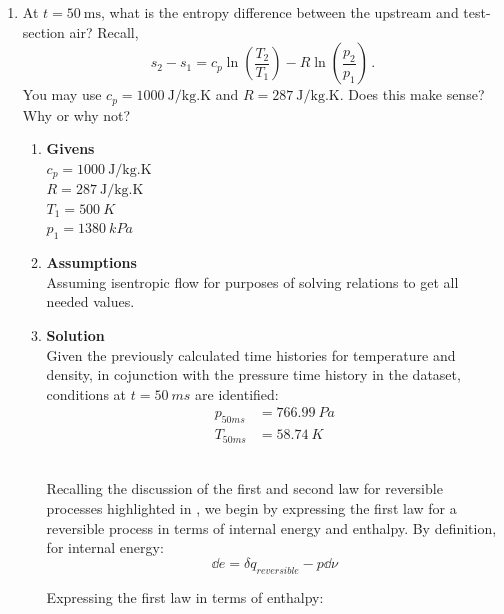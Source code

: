 \documentclass[12pt,letterpaper]{article}
\begin{document}
\begin{enumerate}[label=(\alph*)]
\begin{enumerate}[label=\arabic*.]
		\end{enumerate}
			\item At $t=50 \ \unit{\milli\second}$, what is the entropy difference between the upstream and test-section air? Recall,
			\begin{equation*}
				s_2 - s_1 = c_p \ln(\frac{T_2}{T_1}) - R \ln(\frac{p_2}{p_1}) \,.
			\end{equation*}
			You may use $c_p = 1000 \ \unit{\joule/\kilogram.\kelvin}$ and $R = 287 \ \unit{\joule/\kilogram.\kelvin}$. Does this make sense? Why or why not?
		\begin{enumerate}[label=\arabic*.]
			\item{\textbf{Givens}}\\
			$c_p = 1000 \ \unit{\joule/\kilogram.\kelvin}$\\
			$R = 287 \ \unit{\joule/\kilogram.\kelvin}$\\
			$T_1 = 500 \ K$\\
			$p_1 = 1380 \ \unit{kPa}$

			\item{\textbf{Assumptions}}\\
			Assuming isentropic flow for purposes of solving relations to get all needed values. 

			\item{\textbf{Solution}}\\
			Given the previously calculated time histories for temperature and density, in cojunction with the pressure time history in the dataset, conditions at $t = 50 \ \unit{ms}$ are identified:
			\begin{align*}
				p_{50  \unit{ms}} &= 766.99 \ \unit{Pa}\\
				T_{50  \unit{ms}} &= 58.74 \ K
			\end{align*}\
			
			Recalling the discussion of the first and second law for reversible processes highlighted in , we begin by expressing the first law for a reversible process in terms of internal energy and enthalpy.   
			By definition, for internal energy: 
			\begin{equation*}
				\dd e = \delta q_{reversible} - p\dd \nu
			\end{equation*}
			
			Expressing the first law in terms of enthalpy:


\end{enumerate}
\end{enumerate}
\end{document}
